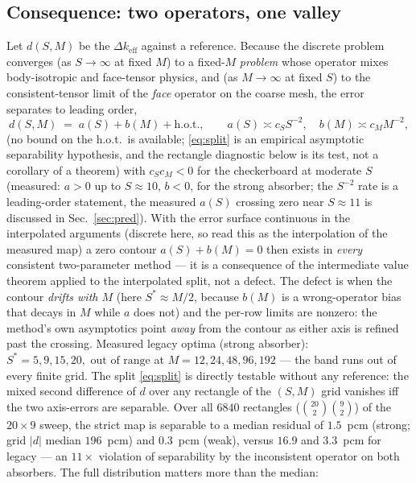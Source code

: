 \documentclass[11pt,a4paper]{article}
\begin{document}
\subsection{Consequence: two operators, one valley}
Let $d(S,M)$ be the $\Delta k_{\mathrm{eff}}$ against a reference.
Because the discrete problem converges (as $S\to\infty$ at fixed $M$)
to a fixed-$M$ \emph{problem} whose operator mixes body-isotropic and
face-tensor physics, and (as $M\to\infty$ at fixed $S$) to the
consistent-tensor limit of the \emph{face} operator on the coarse
mesh, the error separates to leading order,
\begin{equation}
d(S,M) \;=\; a(S) + b(M) + \text{h.o.t.},
\qquad a(S)\asymp c_S S^{-2},\quad
b(M)\asymp c_M M^{-2},
\label{eq:split}
\end{equation}
(no bound on the h.o.t.\ is available; \eqref{eq:split} is an
empirical asymptotic separability hypothesis, and the rectangle
diagnostic below is its test, not a corollary of a theorem)
with $c_S c_M < 0$ for the checkerboard at moderate $S$ (measured:
$a>0$ up to $S\approx10$, $b<0$, for the strong absorber; the
$S^{-2}$ rate is a leading-order statement, the measured $a(S)$
crossing zero near $S\approx11$ is discussed in
Sec.~\ref{sec:pred}).  With the error surface continuous in the
interpolated arguments (discrete here, so read this as the
interpolation of the measured map) a zero contour
$a(S)+b(M)=0$ then exists in
\emph{every} consistent two-parameter method --- it is a consequence of
the intermediate value theorem applied to the interpolated split, not a defect.  The defect is when the
contour \emph{drifts with $M$} (here $S^{*}\approx M/2$, because
$b(M)$ is a wrong-operator bias that decays in $M$ while $a$ does not)
and the per-row limits are nonzero: the method's own asymptotics point
\emph{away} from the contour as either axis is refined past the
crossing.  Measured legacy optima (strong absorber):
$S^{*}=5,9,15,20,\text{ out of range}$ at $M=12,24,48,96,192$ ---
the band runs out of every finite grid.  The split
\eqref{eq:split} is directly testable without any reference: the
mixed second difference of $d$ over any rectangle of the
$(S,M)$ grid vanishes iff the two axis-errors are separable.  Over
all $6840$ rectangles ($\binom{20}{2}\binom{9}{2}$) of the
$20{\times}9$ sweep, the strict map is separable to a median residual
of $1.5$~pcm (strong; grid $|d|$ median $196$~pcm) and $0.3$~pcm
(weak), versus $16.9$ and $3.3$~pcm for legacy --- an
$11\times$ violation of separability by the inconsistent operator on
both absorbers.  The full distribution matters more than the median:
\end{document}
